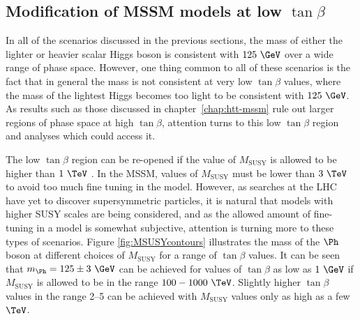 \subsection{Modification of MSSM models at low $\tan\beta$}
\label{sec:lowtanbscenario}

In all of the scenarios discussed in the previous sections, the mass of either
the lighter or heavier scalar Higgs boson is consistent with $125~\GeV$ over a
wide range of phase space. However, one thing common to all of these scenarios
is the fact that in general the mass is not consistent at very low $\tan\beta$
values, where the mass of the lightest Higgs becomes too light to be consistent
with $125~\GeV$. As results such as those discussed in chapter~\ref{chap:htt-mssm} 
rule out larger regions of phase space at high $\tan\beta$, attention turns to this low
$\tan\beta$ region and analyses which could access it.

The low $\tan\beta$ region can be re-opened if the value of $M_{\text{SUSY}}$ is
allowed to be higher than $1~\TeV$ \cite{Djouadi:2013vqa}. In the \ac{MSSM}, values of
$M_{\text{SUSY}}$ must be lower than $3~\TeV$ to avoid too much fine tuning in
the model. However, as searches at the LHC have yet to discover supersymmetric
particles, it is natural that models with higher SUSY scales are being
considered, and as the allowed amount of fine-tuning in a model is somewhat
subjective, attention is turning more to these types of scenarios. Figure
\ref{fig:MSUSYcontours} illustrates the mass of the $\Ph$ boson at different
choices of $M_{\text{SUSY}}$ for a range of $\tan\beta$ values. It can be seen
that $m_{\Ph} = 125\pm 3~\GeV$ can be achieved for values of $\tan\beta$ as low
as $1~\GeV$ if $M_{\text{SUSY}}$ is allowed to be in the range $100-1000~\TeV$.
Slightly higher $\tan\beta$ values in the range 2--5 can be achieved with
$M_{\text{SUSY}}$ values only as high as a few $\TeV$. 

